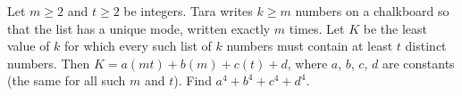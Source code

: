 Let $m\ge2$ and $t\ge2$ be integers. Tara writes $k\ge m$ numbers on a chalkboard so that the list has a unique mode, written exactly $m$ times. Let $K$ be the least value of $k$ for which every such list of $k$ numbers must contain at least $t$ distinct numbers. Then $K=a(mt)+b(m)+c(t)+d$, where $a$, $b$, $c$, $d$ are constants (the same for all such $m$ and $t$). Find $a^4+b^4+c^4+d^4$.
